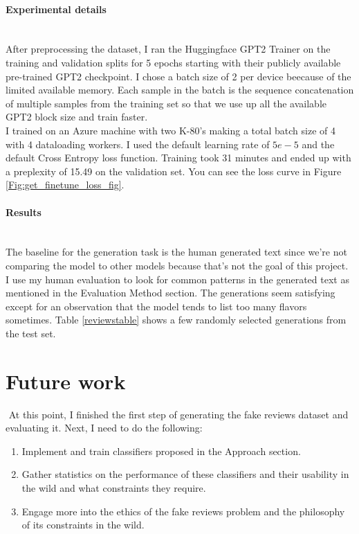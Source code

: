 \documentclass{article}
\begin{document}
\paragraph{Experimental details}$ $
\\ After preprocessing the dataset, I ran the Huggingface GPT2 Trainer on the training and validation splits for 5 epochs starting with their publicly available pre-trained GPT2 checkpoint. I chose a batch size of 2 per device beecause of the limited available memory. Each sample in the batch is the sequence concatenation of multiple samples from the training set so that we use up all the available GPT2 block size and train faster. 
\\ I trained on an Azure machine with two K-80's making a total batch size of 4 with 4 dataloading workers. I used the default learning rate of $5e-5$ and the default Cross Entropy loss function. Training took 31 minutes and ended up with a preplexity of 15.49 on the validation set.  You can see the loss curve in Figure \ref{Fig:get_finetune_loss_fig}.

\paragraph{Results}$ $
\\The baseline for the generation task is the human generated text since we're not comparing the model to other models because that's not the goal of this project. I use my human evaluation to look for common patterns in the generated text as mentioned in the Evaluation Method section.  The generations seem satisfying except for an observation that the model tends to list too many flavors sometimes. Table \ref{reviewstable} shows a few randomly selected generations from the test set.

\section{Future work}$ $
At this point, I finished the first step of generating the fake reviews dataset and evaluating it. Next, I need to do the following:
\begin{enumerate}
\item Implement and train classifiers proposed in the Approach section.
\item Gather statistics on the performance of these classifiers and their usability in the wild and what constraints they require.
\item Engage more into the ethics of the fake reviews problem and the philosophy of its constraints in the wild.
\end{enumerate}
\end{document}
